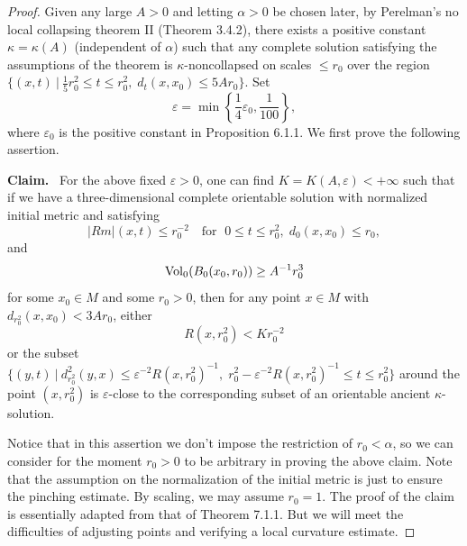 \begin{proof}
Given any large $A>0$ and letting $\alpha>0$ be chosen later,  by
Perelman's no local collapsing theorem II (Theorem 3.4.2), there
exists a positive constant $\kappa=\kappa(A)$ (independent of
$\alpha$) such that any complete solution satisfying the
assumptions of the theorem is $\kappa$-noncollapsed on scales $\le
r_0$ over the region $\{(x,t)\ |\ \frac{1}{5}r_0^2\le t\le
r_0^2,\;d_t(x,x_0)\le 5Ar_0\}.$ Set
$$
\varepsilon = \min \left\{ \frac{1}{4}\varepsilon_0,
\frac{1}{100}\right\},
$$
where $\varepsilon_0$ is the positive constant in Proposition
6.1.1. We first prove the following assertion.

\medskip
{\bf Claim.} \ For the above fixed $\varepsilon>0$, one can find
$K=K(A,\varepsilon)<+\infty$ such that if we have a
three-dimensional complete orientable solution with normalized
initial metric and satisfying
$$
|Rm|(x,t)\le r_0^{-2}\quad \mbox{for }\; 0\le t\le
r_0^2,\;d_0(x,x_0)\le r_0,
$$
and
$$
\operatorname{Vol}_0(B_0(x_0,r_0))\ge A^{-1}r_0^3
$$
for some $x_0 \in M$ and some $r_0 > 0$, then for any point $x\in
M$ with $d_{r_0^2}(x,x_0)<3Ar_0$, either $$R(x,r_0^2)< Kr_0^{-2}$$
or the subset $\{(y,t)\ |\ d_{r_0^2}^2(y,x)\leq \varepsilon^{-2}
R(x,r_0^2)^{-1},\;r_0^2-\varepsilon^{-2} R(x,r_0^2)^{-1}\le t\le
r_0^2\}$ around the point $(x,r_0^2)$ is $\varepsilon$-close to
the corresponding subset of an orientable ancient
$\kappa$-solution.
\medskip

Notice that in this assertion we don't impose the restriction of
$r_0<\alpha$, so we can consider for the moment $r_0>0$ to be
arbitrary in proving the above claim. Note that the assumption on
the normalization of the initial metric is just to ensure the
pinching estimate. By scaling, we may assume $r_0=1$. The proof of
the claim is essentially adapted from that of Theorem 7.1.1. But
we will meet the difficulties of adjusting points and verifying a
local curvature estimate.


\end{proof}
